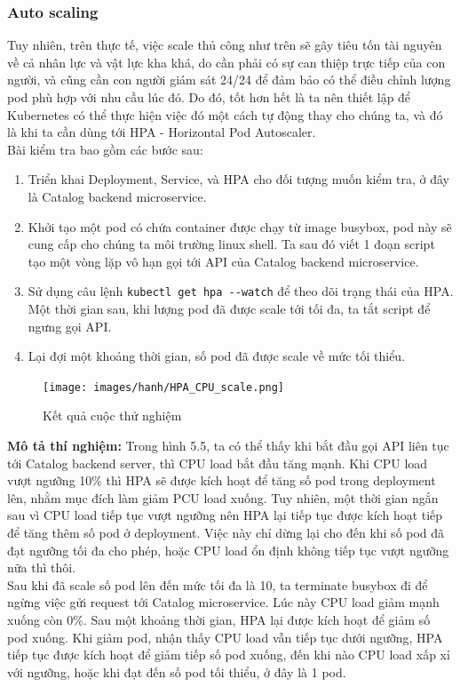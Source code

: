 \subsubsection{Auto scaling}
Tuy nhiên, trên thực tế, việc scale thủ công như trên sẽ gây tiêu tốn tài nguyên về cả nhân lực và vật lực kha khá, do cần phải có sự can thiệp trực tiếp của con người, và cũng cần con người giám sát 24/24 để đảm bảo có thể điều chỉnh lượng pod phù hợp với nhu cầu lúc đó. Do đó, tốt hơn hết là ta nên thiết lập để Kubernetes có thể thực hiện việc đó một cách tự động thay cho chúng ta, và đó là khi ta cần dùng tới HPA - Horizontal Pod Autoscaler.\\[0.5cm]
Bài kiểm tra bao gồm các bước sau:
\begin{enumerate}
  \item Triển khai Deployment, Service, và HPA cho đối tượng muốn kiểm tra, ở đây là Catalog backend microservice.
  \item Khởi tạo một pod có chứa container được chạy từ image busybox, pod này sẽ cung cấp cho chúng ta môi trường linux shell. Ta sau đó viết 1 đoạn script tạo một vòng lặp vô hạn gọi tới API của Catalog backend microservice.
  \item Sử dụng câu lệnh \lstinline|kubectl get hpa --watch| để theo dõi trạng thái của HPA. Một thời gian sau, khi lượng pod đã được scale tới tối đa, ta tắt script để ngưng gọi API. 
  \item Lại đợi một khoảng thời gian, số pod đã được scale về mức tối thiểu. 
\end{enumerate}
\begin{figure}[H]
  \begin{center}
    \texttt{[image: images/hanh/HPA\_CPU\_scale.png]}
    \caption{Kết quả cuộc thử nghiệm}
  \end{center}
\end{figure}
\noindent \textbf{Mô tả thí nghiệm:} Trong hình 5.5, ta có thể thấy khi bắt đầu gọi API liên tục tới Catalog backend server, thì CPU load bắt đầu tăng mạnh. Khi CPU load vượt ngưỡng 10\% thì HPA sẽ được kích hoạt để tăng số pod trong deployment lên, nhằm mục đích làm giảm PCU load xuống. Tuy nhiên, một thời gian ngắn sau vì CPU load tiếp tục vượt ngưỡng nên HPA lại tiếp tục được kích hoạt tiếp để tăng thêm số pod ở deployment. Việc này chỉ dừng lại cho đến khi số pod đã đạt ngưỡng tối đa cho phép, hoặc CPU load ổn định không tiếp tục vượt ngưỡng nữa thì thôi.\\[0.5cm]
Sau khi đã scale số pod lên đến mức tối đa là 10, ta terminate busybox đi để ngừng việc gửi request tới Catalog microservice. Lúc này CPU load giảm mạnh xuống còn 0\%. Sau một khoảng thời gian, HPA lại được kích hoạt để giảm số pod xuống. Khi giảm pod, nhận thấy CPU load vẫn tiếp tục dưới ngưỡng, HPA tiếp tục được kích hoạt để giảm tiếp số pod xuống, đến khi nào CPU load xấp xỉ với ngưỡng, hoặc khi đạt đến số pod tối thiểu, ở đây là 1 pod.

